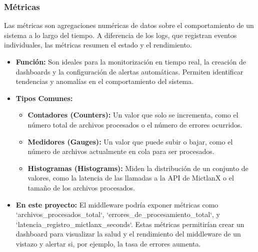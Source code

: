 \subsubsection{Métricas}
Las métricas son agregaciones numéricas de datos sobre el comportamiento de un sistema a lo largo del tiempo. A diferencia de los logs, que registran eventos individuales, las métricas resumen el estado y el rendimiento.
\begin{itemize}
    \item \textbf{Función:} Son ideales para la monitorización en tiempo real, la creación de dashboards y la configuración de alertas automáticas. Permiten identificar tendencias y anomalías en el comportamiento del sistema.
    \item \textbf{Tipos Comunes:}
    \begin{itemize}
        \item \textbf{Contadores (Counters):} Un valor que solo se incrementa, como el número total de archivos procesados o el número de errores ocurridos.
        \item \textbf{Medidores (Gauges):} Un valor que puede subir o bajar, como el número de archivos actualmente en cola para ser procesados.
        \item \textbf{Histogramas (Histograms):} Miden la distribución de un conjunto de valores, como la latencia de las llamadas a la API de MictlanX o el tamaño de los archivos procesados.
    \end{itemize}
    \item \textbf{En este proyecto:} El middleware podría exponer métricas como `archivos\_procesados\_total`, `errores\_de\_procesamiento\_total`, y `latencia\_registro\_mictlanx\_seconds`. Estas métricas permitirían crear un dashboard para visualizar la salud y el rendimiento del middleware de un vistazo y alertar si, por ejemplo, la tasa de errores aumenta.
\end{itemize}

